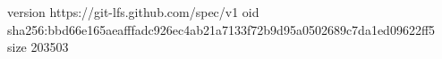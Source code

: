 version https://git-lfs.github.com/spec/v1
oid sha256:bbd66e165aeafffadc926ec4ab21a7133f72b9d95a0502689c7da1ed09622ff5
size 203503

